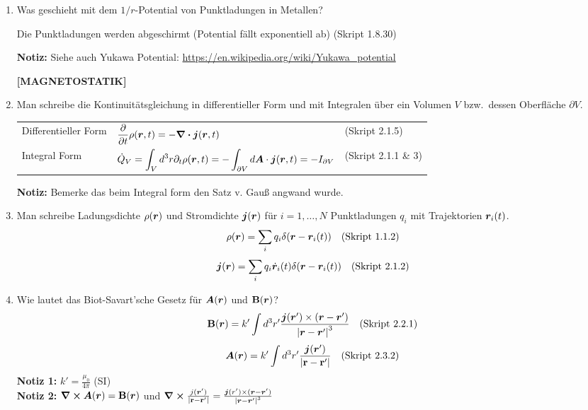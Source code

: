\begin{enumerate}
  \item Was geschieht mit dem $1/r$-Potential von Punktladungen in %
        Metallen?
        \begin{center}
          Die Punktladungen werden abgeschirmt (Potential fällt 
          exponentiell ab)
          (Skript 1.8.30)
        \end{center}
        \textbf{Notiz:} Siehe auch Yukawa Potential: 
        \url{https://en.wikipedia.org/wiki/Yukawa_potential} 

  \clearpage
  \textbf{[MAGNETOSTATIK]}
  \item Man schreibe die Kontinuitätsgleichung in differentieller Form %
        und mit Integralen über ein Volumen $V$ bzw.\ dessen Oberfläche 
        $\partial V$.
        \begin{center}
        \begin{tabular}{lll}
          Differentieller Form 
                            & $\displaystyle\pdv{t}\rho(\vb* r, t)=
                               -\div\vb* j(\vb* r, t)$
                              & (Skript 2.1.5)\\
          Integral Form     & $\displaystyle\dot Q_V
                              =\int_V d^3r\partial_t\rho(\vb* r,t)=
                              -\int_{\partial V}d\vb* A\cdot
                              \vb* j(\vb* r, t)=-I_{\partial V}$
                              & (Skript 2.1.1 \& 3)\\
        \end{tabular}
        \end{center}
        \textbf{Notiz:} Bemerke das beim Integral form den Satz v. Gauß
        angwand wurde.

  \item Man schreibe Ladungsdichte $\rho(\vb* r)$ und Stromdichte %
        $\vb* j(\vb* r)$ für $i=1,\ldots,N$ Punktladungen $q_i$ mit 
        Trajektorien $\vb* r_i(t)$.
        $$\rho(\vb* r)=\sum_i q_i\delta(\vb* r-\vb* r_i(t))
        \quad \text{(Skript 1.1.2)}$$
        $$\vb* j(\vb* r)=\sum_i q_i\dot{\vb* r}_i(t)
        \delta(\vb* r-\vb* r_i(t))
        \quad \text{(Skript 2.1.2)}$$

  \item Wie lautet das Biot-Savart'sche Gesetz für $\vb* A(\vb* r)$ und %
        $\vb B(\vb* r)$?
        $$\vb B(\vb* r)=k'\int d^3r'\frac{\vb* j(\vb* r')\times
        (\vb* r-\vb* r')}{\abs{\vb* r-\vb* r'}^3}
        \quad \text{(Skript 2.2.1)}$$
        $$\vb* A(\vb* r)=k'\int d^3r'\frac{\vb* j(\vb* r')}{\abs{\vb{r}-\vb{r}'}}
        \quad \text{(Skript 2.3.2)}$$
        \textbf{Notiz 1:} $k'=\frac{\mu_0}{4\pi}$ (SI)\\
        \textbf{Notiz 2:} $\curl \vb* A(\vb* r) = \vb B(\vb* r)$ und 
        $\curl \frac{j(\vb* r')}{\abs{\vb{r}-\vb{r}'}}
        =\frac{\vb* j(r') \times (\vb* r - \vb* r')}{\abs{\vb* r - \vb* r'}^3}$


\end{enumerate}
